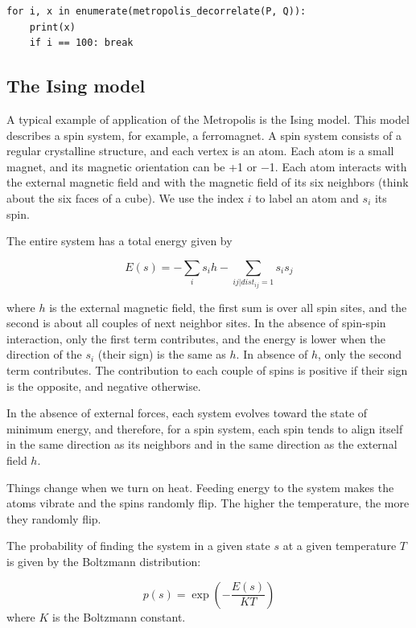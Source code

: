 \documentclass[justified, sixbynine]{tufte-book}
\theoremstyle{plain}%
\newtheorem * {corollary}{Corollary}
\theoremstyle{definition}
\theoremstyle{remark}
\newtheorem * {remark}{Remark}
\newtheorem * {note}{Note}
\begin{document}
\begin{fullwidth}
\begin{lstlisting}
for i, x in enumerate(metropolis_decorrelate(P, Q)):
    print(x)
    if i == 100: break
\end{lstlisting}


\subsection{The Ising model}

A typical example of application of the Metropolis is the Ising model. This model describes a spin system, for example, a ferromagnet. A spin system consists of a regular crystalline structure, and each vertex is an atom. Each atom is a small magnet, and its magnetic orientation can be +1 or $-$1. Each atom interacts with the external magnetic field and with the magnetic field of its six neighbors (think about the six faces of a cube). We use the index $i$ to label an atom and $s_i$ its spin.

The entire system has a total energy given by

\begin{equation}
E(s) = - \sum_i s_i h - \sum_{ij|dist_{ij}=1} s_i s_j
\end{equation}

where $h$ is the external magnetic field, the first sum is over all spin sites, and the second is about all couples of next neighbor sites. In the absence of spin-spin interaction, only the first term contributes, and the energy is lower when the direction of the $s_i$ (their sign) is the same as $h$. In absence of $h$, only the second term contributes. The contribution to each couple of spins is positive if their sign is the opposite, and negative otherwise.

In the absence of external forces, each system evolves toward the state of minimum energy, and therefore, for a spin system, each spin tends to align itself in the same direction as its neighbors and in the same direction as the external field $h$.

Things change when we turn on heat. Feeding energy to the system makes the atoms vibrate and the spins randomly flip. The higher the temperature, the more they randomly flip.

The probability of finding the system in a given state $s$ at a given temperature $T$ is given by the Boltzmann distribution:

\begin{equation}
p(s) = \exp\left(-\frac{E(s)}{KT}\right)
\end{equation}
where $K$ is the Boltzmann constant.


\end{fullwidth}
\end{document}
